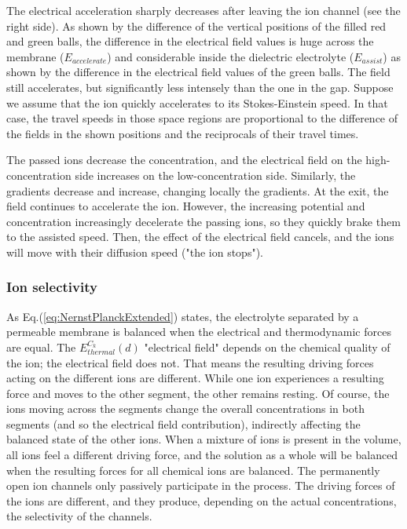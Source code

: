 The electrical acceleration sharply decreases after leaving the ion channel (see the right side). As shown by the difference of the vertical positions of the filled red and green balls, the difference in the electrical field values is huge across the membrane ($E_{accelerate}$) and considerable inside the dielectric
electrolyte ($E_{assist}$) as shown by the difference in the electrical field values of the green balls. The field still accelerates, but significantly less intensely than the one in the gap. Suppose we assume that the ion quickly accelerates to its Stokes-Einstein speed. In that case, the travel speeds in
those space regions are proportional to the difference of the fields
in the shown positions and the reciprocals of their travel times. 

The passed ions decrease the concentration, and the electrical field
on the high-concentration side increases on the low-concentration side. Similarly, the gradients decrease and increase,
changing locally the gradients.
At the exit, the field continues to accelerate the ion. 
However, the increasing potential and concentration 
increasingly decelerate the passing ions, so they quickly brake them to the assisted speed. Then, the effect of the electrical field cancels, and the ions will move with their diffusion speed ("the ion stops").




\subsubsection{Ion selectivity\label{sec:Physics-IonSelectivity}}
As Eq.(\ref{eq:NernstPlanckExtended}) states, the electrolyte separated by a permeable membrane is balanced when the electrical and thermodynamic forces are equal. The $E_{thermal}^{C_k}(d)$ "electrical field" depends on the chemical quality of the ion; the electrical field does not. That means the resulting driving forces acting on the
different ions are different. While one ion experiences a resulting force and moves to the other segment, the other remains resting. Of course, the ions moving across the segments change the overall concentrations in both segments (and so the electrical field contribution), indirectly affecting the balanced state of the other ions. When a mixture of ions is present in the volume,
all ions feel a different driving force, and the solution as a whole will be balanced when the resulting forces for all chemical ions are balanced. The permanently open ion channels only passively participate in the process. The driving forces of the ions are different, and they produce, depending on the actual concentrations, the selectivity of the channels. 

